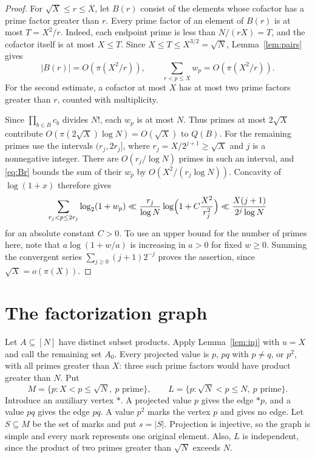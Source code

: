 \documentclass[11pt]{article}
\numberwithin{equation}{section}
\theoremstyle{remark}
\begin{document}
\begin{proof}
For $\sqrt X\le r\le X$, let $B(r)$ consist of the elements whose cofactor has a prime factor greater than $r$. Every prime factor of an element of $B(r)$ is at most $T=X^2/r$. Indeed, each endpoint prime is less than $N/(rX)=T$, and the cofactor itself is at most $X\le T$. Since $X\le T\le X^{3/2}=\sqrt N$, Lemma~\ref{lem:pairs} gives
\begin{equation}\label{eq:Br}
|B(r)|=O(\pi(X^2/r)),\qquad\sum_{r<p\le X}w_p=O(\pi(X^2/r)).
\end{equation}
For the second estimate, a cofactor at most $X$ has at most two prime factors greater than $r$, counted with multiplicity.

Since $\prod_{b\in B}c_b$ divides $N!$, each $w_p$ is at most $N$. Thus primes at most $2\sqrt X$ contribute $O(\pi(2\sqrt X)\log N)=O(\sqrt X)$ to $Q(B)$. For the remaining primes use the intervals $(r_j,2r_j]$, where $r_j=X/2^{j+1}\ge\sqrt X$ and $j$ is a nonnegative integer. There are $O(r_j/\log N)$ primes in such an interval, and \eqref{eq:Br} bounds the sum of their $w_p$ by $O(X^2/(r_j\log N))$. Concavity of $\log(1+x)$ therefore gives
\[
\sum_{r_j<p\le2r_j}\log_2(1+w_p)\ll\frac{r_j}{\log N}\log\Bigl(1+C\frac{X^2}{r_j^2}\Bigr)\ll\frac{X(j+1)}{2^j\log N}
\]
for an absolute constant $C>0$. To use an upper bound for the number of primes here, note that $a\log(1+w/a)$ is increasing in $a>0$ for fixed $w\ge0$. Summing the convergent series $\sum_{j\ge0}(j+1)2^{-j}$ proves the assertion, since $\sqrt X=o(\pi(X))$.
\end{proof}

\section{The factorization graph}\label{sec:graphA}
Let $A\subseteq[N]$ have distinct subset products. Apply Lemma~\ref{lem:inj} with $u=X$ and call the remaining set $A_0$. Every projected value is $p$, $pq$ with $p\ne q$, or $p^2$, with all primes greater than $X$: three such prime factors would have product greater than $N$. Put
\[
M=\{p:X<p\le\sqrt N,\ p\text{ prime}\},\qquad L=\{p:\sqrt N<p\le N,\ p\text{ prime}\}.
\]
Introduce an auxiliary vertex $*$. A projected value $p$ gives the edge $*p$, and a value $pq$ gives the edge $pq$. A value $p^2$ marks the vertex $p$ and gives no edge. Let $S\subseteq M$ be the set of marks and put $s=|S|$. Projection is injective, so the graph is simple and every mark represents one original element. Also, $L$ is independent, since the product of two primes greater than $\sqrt N$ exceeds $N$.
\end{document}
